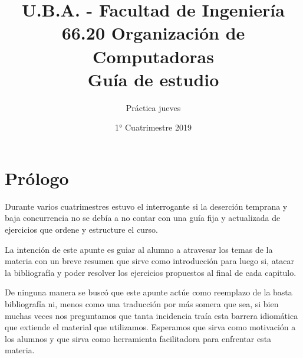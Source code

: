 \documentclass[a4paper, 10pt, twoside, notitlepage]{report}
\title{U.B.A. - Facultad de Ingeniería\\\vspace{0.25cm} 66.20 Organización de Computadoras\\Guía de estudio}
\author{Práctica jueves}
\date{1° Cuatrimestre 2019}
\date{}
\begin{document}
\lstset{%
  basicstyle=\small\ttfamily,
  breaklines=true,
  tabsize=2,
  language=C,
  extendedchars=true
}



\maketitle
\thispagestyle{empty}   %

 \newpage


 \tableofcontents
% 
 \newpage
% 

\pagestyle{fancy}
\fancyhead{}
\fancyfoot{}
\renewcommand{\sectionmark}[1]{\markright{\thesection\ #1}}
\renewcommand{\headrulewidth}{0.4pt}
\renewcommand{\chaptername}{Unidad}
\fancyhead[LE]{\nouppercase \rightmark}
\fancyhead[RE, LO]{\bf \thepage}
\fancyhead[RO]{\nouppercase \rightmark}
\fancyfoot[C]{ }
\maketitle
\setcounter{page}{1}

\parskip 7.2pt
\chapter*{Prólogo}
Durante varios cuatrimestres estuvo el interrogante si la deserción temprana y baja concurrencia no se debía a no contar con una guía fija y actualizada de ejercicios que ordene y estructure el curso.

La intención de este apunte es guiar al alumno a atravesar los temas de la materia con un breve resumen que sirve como introducción para luego si, atacar la bibliografía y poder resolver los ejercicios propuestos al final de cada capitulo. 

De ninguna manera se buscó que este apunte actúe como reemplazo de la basta bibliografía ni, menos como una traducción por más somera que sea, si bien muchas veces nos preguntamos que tanta incidencia traía esta barrera idiomática que extiende el material que utilizamos. Esperamos que sirva como motivación a los alumnos y que sirva como herramienta facilitadora para enfrentar esta materia.
\end{document}
